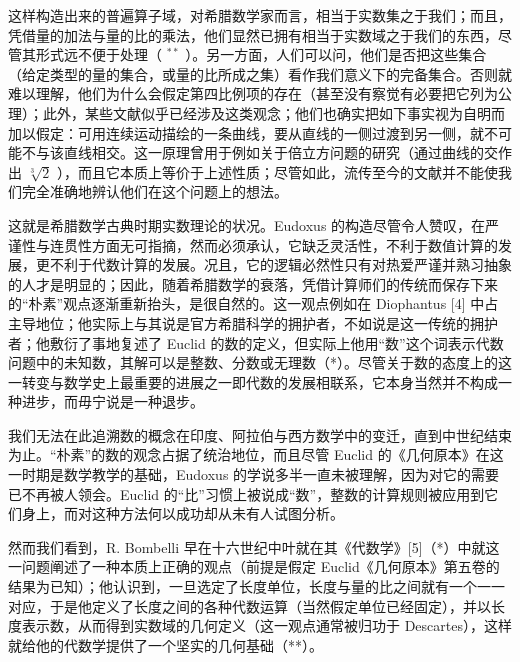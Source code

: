 这样构造出来的普遍算子域，对希腊数学家而言，相当于实数集之于我们；而且，凭借量的加法与量的比的乘法，他们显然已拥有相当于实数域之于我们的东西，尽管其形式远不便于处理（ \(^{**}\) ）。另一方面，人们可以问，他们是否把这些集合（给定类型的量的集合，或量的比所成之集）看作我们意义下的完备集合。否则就难以理解，他们为什么会假定第四比例项的存在（甚至没有察觉有必要把它列为公理）；此外，某些文献似乎已经涉及这类观念；他们也确实把如下事实视为自明而加以假定：可用连续运动描绘的一条曲线，要从直线的一侧过渡到另一侧，就不可能不与该直线相交。这一原理曾用于例如关于倍立方问题的研究（通过曲线的交作出 \(\sqrt[3]{2}\) ），而且它本质上等价于上述性质；尽管如此，流传至今的文献并不能使我们完全准确地辨认他们在这个问题上的想法。

这就是希腊数学古典时期实数理论的状况。Eudoxus 的构造尽管令人赞叹，在严谨性与连贯性方面无可指摘，然而必须承认，它缺乏灵活性，不利于数值计算的发展，更不利于代数计算的发展。况且，它的逻辑必然性只有对热爱严谨并熟习抽象的人才是明显的；因此，随着希腊数学的衰落，凭借计算师们的传统而保存下来的“朴素”观点逐渐重新抬头，是很自然的。这一观点例如在 Diophantus {[}4{]} 中占主导地位；他实际上与其说是官方希腊科学的拥护者，不如说是这一传统的拥护者；他敷衍了事地复述了 Euclid 的数的定义，但实际上他用“数”这个词表示代数问题中的未知数，其解可以是整数、分数或无理数（*）。尽管关于数的态度上的这一转变与数学史上最重要的进展之一即代数的发展相联系，它本身当然并不构成一种进步，而毋宁说是一种退步。

我们无法在此追溯数的概念在印度、阿拉伯与西方数学中的变迁，直到中世纪结束为止。“朴素”的数的观念占据了统治地位，而且尽管 Euclid 的《几何原本》在这一时期是数学教学的基础，Eudoxus 的学说多半一直未被理解，因为对它的需要已不再被人领会。Euclid 的“比”习惯上被说成“数”，整数的计算规则被应用到它们身上，而对这种方法何以成功却从未有人试图分析。

然而我们看到，R. Bombelli 早在十六世纪中叶就在其《代数学》{[}5{]}（*）中就这一问题阐述了一种本质上正确的观点（前提是假定 Euclid《几何原本》第五卷的结果为已知）；他认识到，一旦选定了长度单位，长度与量的比之间就有一个一一对应，于是他定义了长度之间的各种代数运算（当然假定单位已经固定），并以长度表示数，从而得到实数域的几何定义（这一观点通常被归功于 Descartes），这样就给他的代数学提供了一个坚实的几何基础（**）。

